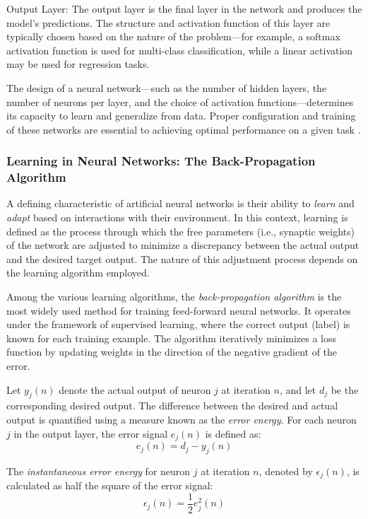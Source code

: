 Output Layer: The output layer is the final layer in the network and produces the model's predictions. The structure and activation function of this layer are typically chosen based on the nature of the problem—for example, a softmax activation function is used for multi-class classification, while a linear activation may be used for regression tasks.

The design of a neural network—such as the number of hidden layers, the number of neurons per layer, and the choice of activation functions—determines its capacity to learn and generalize from data. Proper configuration and training of these networks are essential to achieving optimal performance on a given task \parencite{sazli2006feedforwardnn}.

\subsubsection{Learning in Neural Networks: The Back-Propagation Algorithm}

A defining characteristic of artificial neural networks is their ability to \textit{learn} and \textit{adapt} based on interactions with their environment. In this context, learning is defined as the process through which the free parameters (i.e., synaptic weights) of the network are adjusted to minimize a discrepancy between the actual output and the desired target output. The nature of this adjustment process depends on the learning algorithm employed.

Among the various learning algorithms, the \textit{back-propagation algorithm} is the most widely used method for training feed-forward neural networks. It operates under the framework of supervised learning, where the correct output (label) is known for each training example. The algorithm iteratively minimizes a loss function by updating weights in the direction of the negative gradient of the error.

Let $y_j(n)$ denote the actual output of neuron $j$ at iteration $n$, and let $d_j$ be the corresponding desired output. The difference between the desired and actual output is quantified using a measure known as the \textit{error energy}. For each neuron \( j \) in the output layer, the error signal \( e_j(n) \) is defined as:
\begin{equation}
	e_j(n) = d_j - y_j(n)
\end{equation}

The \textit{instantaneous error energy} for neuron \( j \) at iteration \( n \), denoted by \( \epsilon_j(n) \), is calculated as half the square of the error signal:
\begin{equation}
	\epsilon_j(n) = \frac{1}{2} e_j^2(n)
\end{equation}

